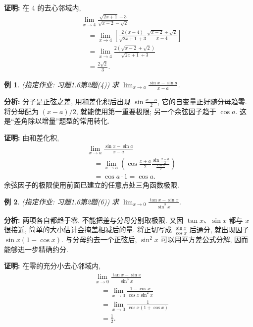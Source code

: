 \documentclass[UTF8,openany]{ctexbook}
\theoremstyle{chinesetextbook}
\newtheorem{example}{例}[section]
\newenvironment{cnproof}{\par\indent\textbf{证明:} \ignorespaces}{\par}
\begin{document}
\begin{cnproof}
在 $4$ 的去心邻域内,
\[
\begin{aligned}
&\lim_{x\to4}\frac{\sqrt{2x+1}-3}{\sqrt{x-2}-\sqrt2}\\
&\quad=\lim_{x\to4}\left[\frac{2(x-4)}{\sqrt{2x+1}+3}\frac{\sqrt{x-2}+\sqrt2}{x-4}\right]\\
&\quad=\lim_{x\to4}\frac{2(\sqrt{x-2}+\sqrt2)}{\sqrt{2x+1}+3}\\
&\quad=\frac{2\sqrt2}3.
\end{aligned}
\]
\end{cnproof}
\begin{example}
(指定作业: 习题1.6第2题(4)) 求 $\displaystyle \lim_{x\to a}\frac{\sin x-\sin a}{x-a}$.
\end{example}
\par\indent\textbf{分析:} 分子是正弦之差, 用和差化积后出现 $\displaystyle\sin\frac{x-a}2$, 它的自变量正好随分母趋零. 将分母配为 $(x-a)/2$, 就能使用第一重要极限; 另一个余弦因子趋于 $\cos a$. 这是“差角除以增量”题型的常用转化.
\begin{cnproof}
由和差化积,
\[
\begin{aligned}
&\lim_{x\to a}\frac{\sin x-\sin a}{x-a}\\
&\quad=\lim_{x\to a}\left(\cos\frac{x+a}{2}\frac{\sin\frac{x-a}{2}}{\frac{x-a}{2}}\right)\\
&\quad=\cos a\cdot1=\cos a.
\end{aligned}
\]
余弦因子的极限使用前面已建立的任意点处三角函数极限.
\end{cnproof}
\begin{example}
(指定作业: 习题1.6第2题(6)) 求 $\displaystyle \lim_{x\to0}\frac{\tan x-\sin x}{\sin^3x}$.
\end{example}
\par\indent\textbf{分析:} 两项各自都趋于零, 不能把差与分母分别取极限. 又因 $\tan x$、$\sin x$ 都与 $x$ 很接近, 简单的大小估计会掩盖相减后的量. 将正切写成 $\displaystyle\frac{\sin x}{\cos x}$ 后通分, 就出现因子 $\sin x(1-\cos x)$. 与分母约去一个正弦后, $\sin^2x$ 可以用平方差公式分解, 因而能够进一步精确约分.
\begin{cnproof}
在零的充分小去心邻域内,
\[
\begin{aligned}
&\lim_{x\to0}\frac{\tan x-\sin x}{\sin^3x}\\
&\quad=\lim_{x\to0}\frac{1-\cos x}{\cos x\sin^2x}\\
&\quad=\lim_{x\to0}\frac1{\cos x(1+\cos x)}\\
&\quad=\frac12.
\end{aligned}
\]
\end{cnproof}
\end{document}

